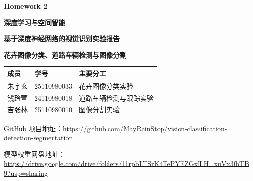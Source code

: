 \documentclass[UTF8,a4paper,11pt]{ctexart}
\newcommand{\accpm}[2]{#1\% $\pm$ #2\%}
\begin{document}
\begin{center}
    {\bfseries Homework 2\par}
    \vspace{0.5em}
    {\bfseries 深度学习与空间智能\par}
    \vspace{1.0em}
    {\bfseries 基于深度神经网络的视觉识别实验报告\par}
    \vspace{0.4em}
    {\bfseries 花卉图像分类、道路车辆检测与图像分割\par}
\end{center}

\vspace{0.6em}

\begin{center}
    \small
    \begin{tabular}{lll}
        \toprule
        成员 & 学号 & 主要分工 \\
        \midrule
        朱宇玄 & 25110980033 & 花卉图像分类实验 \\
        钱玲萱 & 24110980018 & 道路车辆检测与跟踪实验 \\
        吉张林 & 25110980010 & 图像分割实验 \\
        \bottomrule
    \end{tabular}
\end{center}

\vspace{0.4em}

\begin{center}
    \small
    GitHub 项目地址：\url{https://github.com/MayRainStop/vision-classification-detection-segmentation}

    模型权重网盘地址：\url{https://drive.google.com/drive/folders/11rpbLTSrK4TePYEZGxlLH_xuVx3fbTB9?usp=sharing}
\end{center}

\vspace{0.6em}

\begin{abstract}
本文围绕三类典型视觉识别问题展开实验：细粒度花卉图像分类、道路车辆检测与跟踪、图像分割。花卉分类实验使用 Oxford 102 Flowers 数据集，系统比较 ResNet baseline、ImageNet 预训练与从零训练、SE/CBAM 注意力模块、ViT/Swin Transformer 以及 ConvNeXt 等现代卷积网络；最终 ConvNeXt-Tiny 在 384px 输入和 10 个随机种子下取得 \accpm{95.60}{0.61} 的测试准确率。车辆检测实验使用 YOLOv8s 在道路车辆数据集上训练检测器，验证集 mAP50 为 0.520，并结合 ByteTrack 完成跟踪 ID 显示、越线计数和遮挡失败分析。图像分割实验从零实现轻量 U-Net，在 Stanford Background / ICCV09 风格数据上比较 Cross-Entropy、Dice 与组合损失，组合损失取得最高验证集 mIoU 0.6531。实验结果表明，预训练特征、注意力机制、输入分辨率、检测稳定性和区域重叠损失都会显著影响视觉识别系统的最终泛化性能。
\end{abstract}
\end{document}
